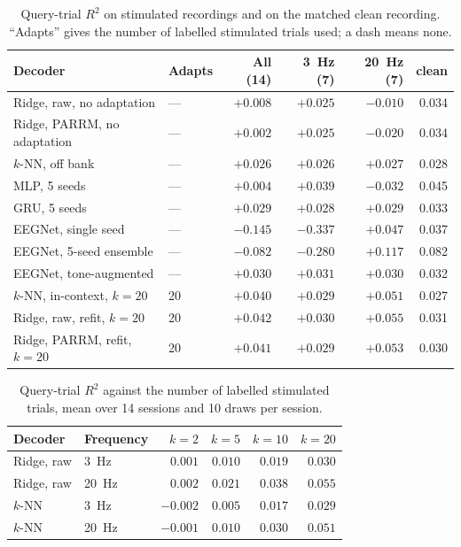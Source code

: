 \documentclass[11pt]{article}
\newcommand{\Rtwo}{R^{2}}
\begin{document}
\begin{table}[!t]
\centering
\small
\caption{Query-trial $\Rtwo$ on stimulated recordings and on the matched clean recording.
``Adapts'' gives the number of labelled stimulated trials used; a dash means none.}
\label{tab:main}
\begin{tabular}{@{}llrrrr@{}}
\toprule
Decoder & Adapts & All (14) & 3~Hz (7) & 20~Hz (7) & clean \\
\midrule
Ridge, raw, no adaptation       & --- & $+0.008$ & $+0.025$ & $-0.010$ & 0.034 \\
Ridge, PARRM, no adaptation     & --- & $+0.002$ & $+0.025$ & $-0.020$ & 0.034 \\
$k$-NN, off bank                & --- & $+0.026$ & $+0.026$ & $+0.027$ & 0.028 \\
MLP, 5 seeds                    & --- & $+0.004$ & $+0.039$ & $-0.032$ & 0.045 \\
GRU, 5 seeds                    & --- & $+0.029$ & $+0.028$ & $+0.029$ & 0.033 \\
EEGNet, single seed             & --- & $-0.145$ & $-0.337$ & $+0.047$ & 0.037 \\
EEGNet, 5-seed ensemble         & --- & $-0.082$ & $-0.280$ & $+0.117$ & 0.082 \\
EEGNet, tone-augmented          & --- & $+0.030$ & $+0.031$ & $+0.030$ & 0.032 \\
\midrule
$k$-NN, in-context, $k=20$      & 20 & $+0.040$ & $+0.029$ & $+0.051$ & 0.027 \\
Ridge, raw, refit, $k=20$       & 20 & $+0.042$ & $+0.030$ & $+0.055$ & 0.031 \\
Ridge, PARRM, refit, $k=20$     & 20 & $+0.041$ & $+0.029$ & $+0.053$ & 0.030 \\
\bottomrule
\end{tabular}
\end{table}

\begin{table}[!t]
\centering
\small
\caption{Query-trial $\Rtwo$ against the number of labelled stimulated trials, mean over 14
sessions and 10 draws per session.}
\label{tab:dose}
\begin{tabular}{@{}llrrrr@{}}
\toprule
Decoder & Frequency & $k=2$ & $k=5$ & $k=10$ & $k=20$ \\
\midrule
Ridge, raw & 3~Hz  & $0.001$ & $0.010$ & $0.019$ & $0.030$ \\
Ridge, raw & 20~Hz & $0.002$ & $0.021$ & $0.038$ & $0.055$ \\
$k$-NN     & 3~Hz  & $-0.002$ & $0.005$ & $0.017$ & $0.029$ \\
$k$-NN     & 20~Hz & $-0.001$ & $0.010$ & $0.030$ & $0.051$ \\
\bottomrule
\end{tabular}
\end{table}
\end{document}
